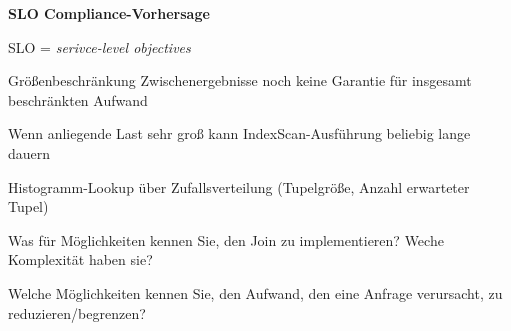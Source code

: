 \textbf{SLO Compliance-Vorhersage}
\begin{items}
	\item SLO = \emph{serivce-level objectives}
	\item Größenbeschränkung Zwischenergebnisse noch keine Garantie für insgesamt beschränkten Aufwand
	\item Wenn anliegende Last sehr groß kann IndexScan-Ausführung beliebig lange dauern
	\item Histogramm-Lookup über Zufallsverteilung (Tupelgröße, Anzahl erwarteter Tupel)
\end{items}

\begin{fragen}
	\begin{enumeration}
		\item Was für Möglichkeiten kennen Sie, den Join zu implementieren? Weche Komplexität haben sie?
		\item Welche Möglichkeiten kennen Sie, den Aufwand, den eine Anfrage verursacht, zu reduzieren/begrenzen?
	\end{enumeration}
\end{fragen}